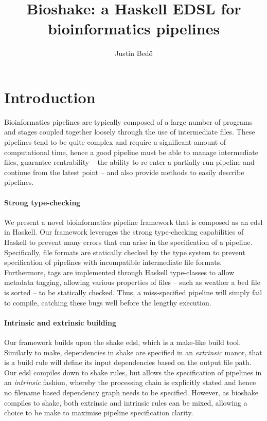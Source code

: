 \documentclass{article}
\author{Justin Bedő}
\title{Bioshake: a Haskell EDSL for bioinformatics pipelines}
\begin{document}
\maketitle

\section{Introduction}

Bioinformatics pipelines are typically composed of a large number of programs
and stages coupled together loosely through the use of intermediate files.
These pipelines tend to be quite complex and require a significant amount of
computational time, hence a good pipeline must be able to
manage intermediate files, guarantee rentrability -- the ability to re-enter
a partially run pipeline and continue from the latest point -- and also provide
methods to easily describe pipelines.

\paragraph{Strong type-checking}

We present a novel bioinformatics pipeline framework that is composed as an
\ac{edsl} in Haskell. Our framework leverages the strong type-checking
capabilities of Haskell to prevent many errors that can arise in the
specification of a pipeline. Specifically, file formats are statically checked
by the type system to prevent specification of pipelines with incompatible
intermediate file formats. Furthermore, tags are implemented through Haskell
type-classes to allow metadata tagging, allowing various properties of files --
such as weather a bed file is sorted -- to be statically checked. Thus, a
miss-specified pipeline will simply fail to compile, catching these bugs well
before the lengthy execution.

\paragraph{Intrinsic and extrinsic building}

Our framework builds upon the shake \ac{edsl}, which is a make-like build tool.
Similarly to make, dependencies in shake are specified in an \textit{extrinsic}
manor, that is a build rule will define its input dependencies based on the
output file path. Our \ac{edsl} compiles down to shake rules, but allows the
specification of pipelines in an \textit{intrinsic} fashion, whereby the
processing chain is explicitly stated and hence no filename based dependency
graph needs to be specified. However, as bioshake compiles to shake, both
extrinsic and intrinsic rules can be mixed, allowing a choice to be make to
maximise pipeline specification clarity.
\end{document}
